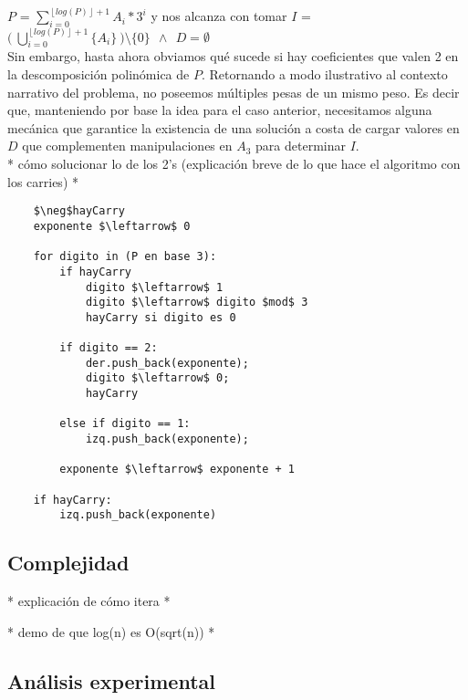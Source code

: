 	$P$ = $\sum_{i = 0}^{\left \lfloor{log(P)}\right \rfloor + 1} A_i*3^{i}$ y nos alcanza con tomar $I$ = $\bigl ( \ \bigcup_{i=0}^{\left \lfloor{log(P)}\right \rfloor + 1} \{A_i\} \ \bigr ) \setminus \{0\} \ \ \wedge \ \ D = \emptyset $
	\\
	
	Sin embargo, hasta ahora obviamos qué sucede si hay coeficientes que valen 2 en la descomposición polinómica de $P$. Retornando a modo ilustrativo al contexto narrativo del problema, no poseemos múltiples pesas de un mismo peso. Es decir que, manteniendo por base la idea para el caso anterior, necesitamos alguna mecánica que garantice la existencia de una solución a costa de cargar valores en $D$ que complementen manipulaciones en $A_3$ para determinar $I$. 
	\\
	
	* cómo solucionar lo de los 2's (explicación breve de lo que hace el algoritmo con los carries) * 
	\\
	
\lstset{basicstyle=\large}
\begin{lstlisting}
    $\neg$hayCarry
    exponente $\leftarrow$ 0

    for digito in (P en base 3):
        if hayCarry
            digito $\leftarrow$ 1
            digito $\leftarrow$ digito $mod$ 3
            hayCarry si digito es 0

        if digito == 2:
            der.push_back(exponente);
            digito $\leftarrow$ 0;
            hayCarry

        else if digito == 1:
            izq.push_back(exponente);
        
        exponente $\leftarrow$ exponente + 1
    
    if hayCarry:
        izq.push_back(exponente)

\end{lstlisting}


\subsection{Complejidad}
	* explicación de cómo itera *

	* demo de que log(n) es O(sqrt(n)) *

\subsection{Análisis experimental}
